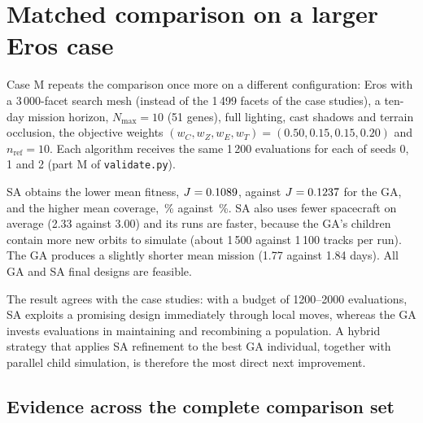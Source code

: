 \section{Matched comparison on a larger Eros case}
\label{sec:garesults}

Case M repeats the comparison once more on a different configuration: Eros with a 3\,000-facet search
mesh (instead of the 1\,499 facets of the case studies), a ten-day mission horizon, $N_{\max}=10$
(51 genes), full lighting, cast shadows and terrain occlusion, the objective weights
$(w_C,w_Z,w_E,w_T)=(0.50,0.15,0.15,0.20)$ and $n_{\mathrm{ref}}=10$. Each algorithm receives the same
1\,200 evaluations for each of seeds 0, 1 and 2 (part M of \texttt{validate.py}).

\begin{table}[htbp]
\centering
\caption{Matched comparison of GA and SA on Eros (case M, 1200 evaluations each). Lower $J$ is
better; all final designs are feasible. Runtime: wall-clock seconds of one run with nine runs in
parallel on the same machine.}
\label{tab:current-ga-sa}
\small

\end{table}

\ac{SA} obtains the lower mean fitness, $J=0.1089$, against $J=0.1237$ for the \ac{GA},
and the higher mean coverage, \saMatchedC\,\% against \gaMatchedC\,\%. \ac{SA} also uses fewer spacecraft on average (2.33 against 3.00) and its runs
are faster, because the \ac{GA}'s children contain more new orbits to simulate (about 1\,500 against
1\,100 tracks per run). The \ac{GA} produces a slightly shorter mean mission (1.77 against 1.84 days).
All \gaMatchedFeasible{} \ac{GA} and \saMatchedFeasible{} \ac{SA} final designs are feasible.

The result agrees with the case studies: with a budget of 1200--2000 evaluations, \ac{SA} exploits a
promising design immediately through local moves, whereas the \ac{GA} invests evaluations in
maintaining and recombining a population. A hybrid strategy that applies \ac{SA} refinement to the
best \ac{GA} individual, together with parallel child simulation, is therefore the most direct next
improvement.

\subsection{Evidence across the complete comparison set}
\label{sec:ga-sa-all-tests}

